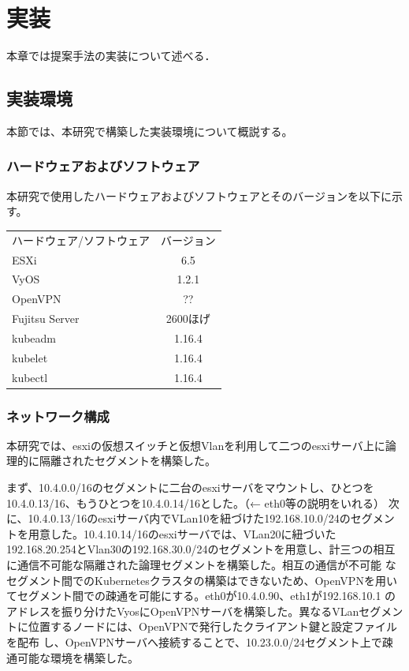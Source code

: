 \chapter{実装}
\label{implementation}

本章では提案手法の実装について述べる．

\section{実装環境}
\label{implementation:environment}
本節では、本研究で構築した実装環境について概説する。

\subsection{ハードウェアおよびソフトウェア}
\label{implementation:environment:resouces}
本研究で使用したハードウェアおよびソフトウェアとそのバージョンを以下に示す。

\begin{table}[htb]
  \begin{tabular}{lc}
    ハードウェア/ソフトウェア & バージョン \\
    ESXi & 6.5 \\
    VyOS & 1.2.1 \\
    OpenVPN & ?? \\
    Fujitsu Server & 2600ほげ \\
    kubeadm & 1.16.4 \\
    kubelet & 1.16.4 \\
    kubectl & 1.16.4 \\
  \end{tabular}
\end{table}

\subsection{ネットワーク構成}
\label{implementation:network-environment}
本研究では、esxiの仮想スイッチと仮想Vlanを利用して二つのesxiサーバ上に論理的に隔離されたセグメントを構築した。

まず、10.4.0.0/16のセグメントに二台のesxiサーバをマウントし、ひとつを10.4.0.13/16、もうひとつを10.4.0.14/16とした。（← eth0等の説明をいれる）
次に、10.4.0.13/16のesxiサーバ内でVLan10を紐づけた192.168.10.0/24のセグメントを用意した。10.4.10.14/16のesxiサーバでは、VLan20に紐づいた
192.168.20.254とVlan30の192.168.30.0/24のセグメントを用意し、計三つの相互に通信不可能な隔離された論理セグメントを構築した。相互の通信が不可能
なセグメント間でのKubernetesクラスタの構築はできないため、OpenVPNを用いてセグメント間での疎通を可能にする。eth0が10.4.0.90、eth1が192.168.10.1
のアドレスを振り分けたVyosにOpenVPNサーバを構築した。異なるVLanセグメントに位置するノードには、OpenVPNで発行したクライアント鍵と設定ファイルを配布
し、OpenVPNサーバへ接続することで、10.23.0.0/24セグメント上で疎通可能な環境を構築した。

